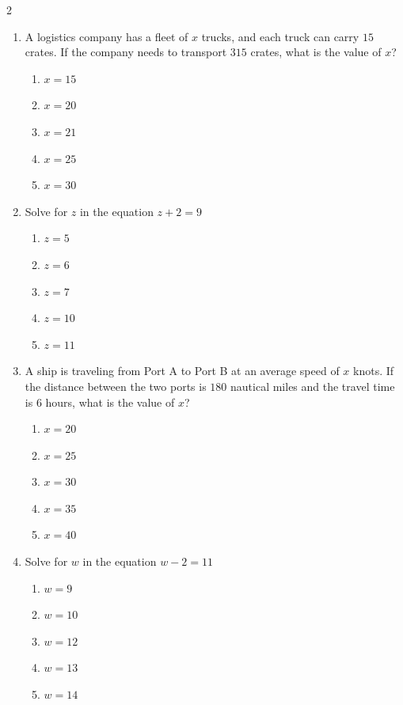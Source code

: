 \documentclass[10pt]{article}
\begin{document}
\begin{multicols}{2}
\begin{enumerate}[label=\textbf{Q\arabic*.}, leftmargin=*, itemsep=6pt, parsep=0pt]
  \item \small A logistics company has a fleet of $x$ trucks, and each truck can carry $15$ crates. If the company needs to transport $315$ crates, what is the value of $x$?
  \begin{enumerate}[label=(\Alph*), leftmargin=0.6cm, nosep, itemsep=2pt]
    \item $x = 15$
    \item $x = 20$
    \item $x = 21$
    \item $x = 25$
    \item $x = 30$
  \end{enumerate}

  \item \small Solve for $z$ in the equation $z + 2 = 9$
  \begin{enumerate}[label=(\Alph*), leftmargin=0.6cm, nosep, itemsep=2pt]
    \item $z = 5$
    \item $z = 6$
    \item $z = 7$
    \item $z = 10$
    \item $z = 11$
  \end{enumerate}

  \item \small A ship is traveling from Port A to Port B at an average speed of $x$ knots. If the distance between the two ports is $180$ nautical miles and the travel time is $6$ hours, what is the value of $x$?
  \begin{enumerate}[label=(\Alph*), leftmargin=0.6cm, nosep, itemsep=2pt]
    \item $x = 20$
    \item $x = 25$
    \item $x = 30$
    \item $x = 35$
    \item $x = 40$
  \end{enumerate}

  \item \small Solve for $w$ in the equation $w - 2 = 11$
  \begin{enumerate}[label=(\Alph*), leftmargin=0.6cm, nosep, itemsep=2pt]
    \item $w = 9$
    \item $w = 10$
    \item $w = 12$
    \item $w = 13$
    \item $w = 14$
  \end{enumerate}


\end{enumerate}
\end{multicols}
\end{document}
